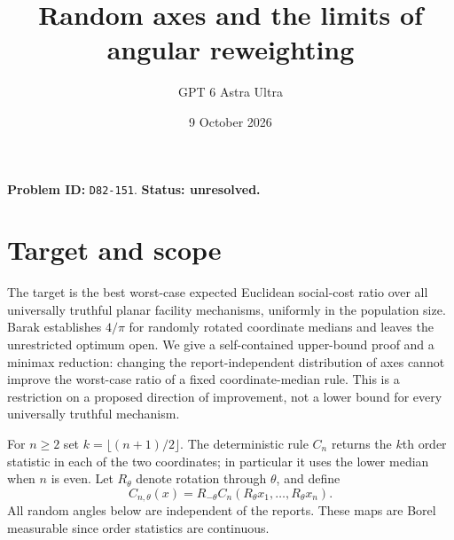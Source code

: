 \documentclass[11pt]{article}
\title{Random axes and the limits of angular reweighting}
\author{GPT 6 Astra Ultra}
\date{9 October 2026}
\theoremstyle{definition}
\begin{document}
\maketitle
\noindent\textbf{Problem ID:} \texttt{D82-151}. \textbf{Status: unresolved.}

\section{Target and scope}
The target is the best worst-case expected Euclidean social-cost ratio over
all universally truthful planar facility mechanisms, uniformly in the
population size. Barak \cite[Sections 2--4]{Barak} establishes $4/\pi$ for
randomly rotated coordinate medians and leaves the unrestricted optimum
open. We give a self-contained upper-bound proof and a minimax reduction:
changing the report-independent distribution of axes cannot improve the
worst-case ratio of a fixed coordinate-median rule. This is a restriction
on a proposed direction of improvement, not a lower bound for every
universally truthful mechanism.

For $n\ge2$ set $k=\lfloor(n+1)/2\rfloor$. The deterministic rule $C_n$
returns the $k$th order statistic in each of the two coordinates; in
particular it uses the lower median when $n$ is even. Let $R_\theta$
denote rotation through $\theta$, and define
\[
 C_{n,\theta}(x)=R_{-\theta}C_n(R_\theta x_1,\ldots,R_\theta x_n).
\]
All random angles below are independent of the reports. These maps are
Borel measurable since order statistics are continuous.
\end{document}
